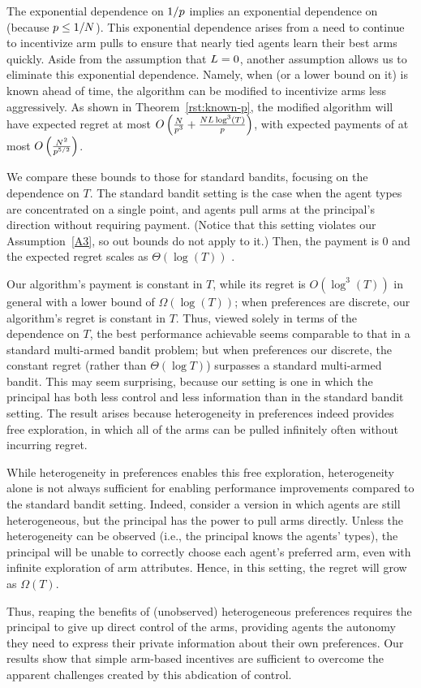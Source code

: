 The exponential dependence on $1/p$ implies an exponential
dependence on \ARMNUM (because $p \leq 1/N$).
This exponential dependence arises from a need to continue to
incentivize arm pulls to ensure that nearly tied agents learn their
best arms quickly.
Aside from the assumption that $L = 0$, another assumption
allows us to eliminate this exponential dependence.
Namely, when \MinProb (or a lower bound on it) is known ahead of time,
the algorithm can be modified to incentivize arms less aggressively.
As shown in Theorem~\ref{rst:known-p},
the modified algorithm will have expected regret at most
$O \left(\frac{N}{p^3}
+\frac{N L \log^3(T)}{p} \right)$,
with expected payments of at most
$O \left(\frac{N^2}{p^{5/2}} \right)$.

We compare these bounds to those for standard bandits,
focusing on the dependence on $T$.  
The standard bandit setting is the case when the agent types \AgV
are concentrated on a single point, and agents pull arms at the
principal's direction without requiring payment.
(Notice that this setting violates our Assumption~\ref{A3},
so out bounds do not apply to it.)
Then, the payment is $0$ and the expected regret scales as
$\Theta(\log(T))$ \cite[Theorem 2.1]{bubeck2012regret}.

Our algorithm's payment is constant in $T$,
while its regret is $O(\log^3(T))$ in general with a lower bound of
$\Omega(\log(T))$;
when preferences are discrete, our algorithm's regret is
constant in $T$.
Thus, viewed solely in terms of the dependence on $T$,
the best performance achievable seems comparable to that in a standard
multi-armed bandit problem;
but when preferences our discrete, the constant regret (rather than
$\Theta(\log T)$) surpasses a standard multi-armed bandit.
This may seem surprising, because our setting is one in which the
principal has both less control and less information than in the
standard bandit setting.
The result arises because heterogeneity in preferences indeed provides
free exploration, in which all of the arms can be pulled infinitely
often without incurring regret.

While heterogeneity in preferences enables this free exploration,
heterogeneity alone is not always sufficient for enabling performance
improvements compared to the standard bandit setting.
Indeed, consider a version in which agents are still heterogeneous,
but the principal has the power to pull arms directly.
Unless the heterogeneity can be observed (i.e., the principal knows
the agents' types), the principal will be unable to correctly choose
each agent's preferred arm,
even with infinite exploration of arm attributes.
Hence, in this setting, the regret will grow as $\Omega(T)$. 

Thus, reaping the benefits of (unobserved) heterogeneous preferences
requires the principal to give up direct control of the arms,
providing agents the autonomy they need to express their private
information about their own preferences.
Our results show that simple arm-based incentives are sufficient
to overcome the apparent challenges created by this abdication of
control.
